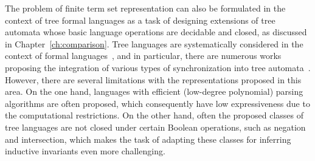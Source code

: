 The problem of finite term set representation can also be formulated in the context of tree formal languages as a task of designing extensions of tree automata whose basic language operations are decidable and closed, as discussed in Chapter~\ref{ch:comparison}. Tree languages are systematically considered in the context of formal languages~\cite{10.5555/267871}, and in particular, there are numerous works proposing the integration of various types of synchronization into tree automata~\cite{chabin2007visibly, gouranton2001synchronized, limet2001weakly, chabin2006synchronized, jacquemard2009rigid, engelfriet2017multiple}. However, there are several limitations with the representations proposed in this area. On the one hand, languages with efficient (low-degree polynomial) parsing algorithms are often proposed, which consequently have low expressiveness due to the computational restrictions. On the other hand, often the proposed classes of tree languages are not closed under certain Boolean operations, such as negation and intersection, which makes the task of adapting these classes for inferring inductive invariants even more challenging.


